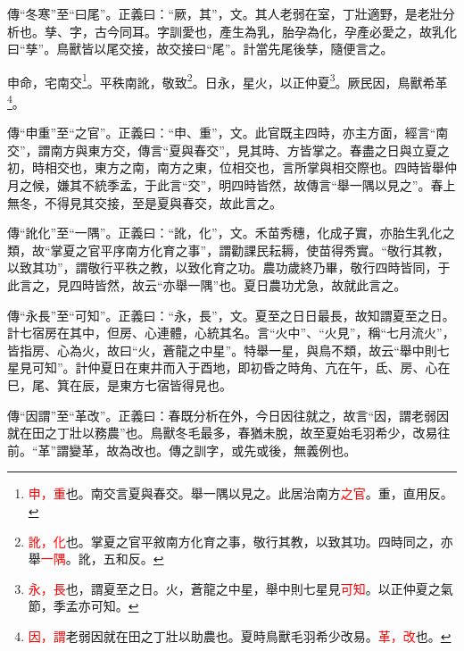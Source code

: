 {\noindent\zhuan{}\fzbyks 傳“冬寒”至“曰尾”。正義曰：“厥，其”，文。其人老弱在室，丁壯適野，是老壯分析也。孳、字，古今同耳。字訓愛也，產生為乳，胎孕為化，孕產必愛之，故乳化曰“孳”。鳥獸皆以尾交接，故交接曰“尾”。計當先尾後孳，隨便言之。 \par}

申命，宅南交\footnote{\textcolor{red}{申，重}也。南交言夏與春交。舉一隅以見之。此居治南方\textcolor{red}{之官}。重，直用反。}。平秩南訛，敬致\footnote{\textcolor{red}{訛，化}也。掌夏之官平敘南方化育之事，敬行其教，以致其功。四時同之，亦舉\textcolor{red}{一隅}。訛，五和反。}。日永，星火，以正仲夏\footnote{\textcolor{red}{永，長}也，謂夏至之日。火，蒼龍之中星，舉中則七星見\textcolor{red}{可知}。以正仲夏之氣節，季孟亦可知。}。厥民因，鳥獸希革\footnote{\textcolor{red}{因，謂}老弱因就在田之丁壯以助農也。夏時鳥獸毛羽希少改易。\textcolor{red}{革，改}也。}。

{\noindent\zhuan{}\fzbyks 傳“申重”至“之官”。正義曰：“申、重”，文。此官既主四時，亦主方面，經言“南交”，謂南方與東方交，傳言“夏與春交”，見其時、方皆掌之。春盡之日與立夏之初，時相交也，東方之南，南方之東，位相交也，言所掌與相交際也。四時皆舉仲月之候，嫌其不統季孟，于此言“交”，明四時皆然，故傳言“舉一隅以見之”。春上無冬，不得見其交接，至是夏與春交，故此言之。 \par}

{\noindent\zhuan{}\fzbyks 傳“訛化”至“一隅”。正義曰：“訛，化”，文。禾苗秀穗，化成子實，亦胎生乳化之類，故“掌夏之官平序南方化育之事”，謂勸課民耘耨，使苗得秀實。“敬行其教，以致其功”，謂敬行平秩之教，以致化育之功。農功歲終乃畢，敬行四時皆同，于此言之，見四時皆然，故云“亦舉一隅”也。夏日農功尤急，故就此言之。 \par}

{\noindent\zhuan{}\fzbyks 傳“永長”至“可知”。正義曰：“永，長”，文。夏至之日日最長，故知謂夏至之日。計七宿房在其中，但房、心連體，心統其名。言“火中”、“火見”，稱“七月流火”，皆指房、心為火，故曰“火，蒼龍之中星”。特舉一星，與鳥不類，故云“舉中則七星見可知”。計仲夏日在東井而入于酉地，即初昏之時角、亢在午，氐、房、心在巳，尾、箕在辰，是東方七宿皆得見也。 \par}

{\noindent\zhuan{}\fzbyks 傳“因謂”至“革改”。正義曰：春既分析在外，今日因往就之，故言“因，謂老弱因就在田之丁壯以務農”也。鳥獸冬毛最多，春猶未脫，故至夏始毛羽希少，改易往前。“革”謂變革，故為改也。傳之訓字，或先或後，無義例也。 \par}

